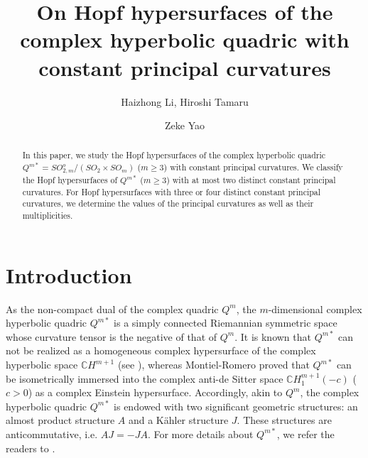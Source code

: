 \documentclass[reqno]{amsart}%
\title[On Hopf hypersurfaces of the complex hyperbolic quadric]
{On Hopf hypersurfaces of the complex hyperbolic quadric with constant principal curvatures}
\author{Haizhong Li, Hiroshi Tamaru \and Zeke Yao}
\date{}
\theoremstyle{definition}
\numberwithin{equation}{section}
\begin{document}
\begin{abstract}
In this paper, we study the Hopf hypersurfaces of the complex hyperbolic quadric
$Q^{m*}=SO^o_{2,m}/(SO_2\times SO_m)$ ($m\geq3$) with constant principal curvatures.
We classify the Hopf hypersurfaces of $Q^{m*}$ ($m\geq3$) with at most two
distinct constant principal curvatures. For Hopf hypersurfaces with three or four distinct constant principal curvatures, we determine the values of the principal curvatures as well as their multiplicities.
\end{abstract}

\maketitle

\section{Introduction}\label{sect:1}

As the non-compact dual of the complex quadric $Q^m$, the $m$-dimensional complex hyperbolic quadric
$Q^{m\ast}$ is a simply connected Riemannian symmetric space whose curvature tensor is
the negative of that of $Q^m$. It is known that $Q^{m\ast}$ can not be realized as a
homogeneous complex hypersurface of the complex hyperbolic space $\mathbb{C}H^{m+1}$
(see \cite{Sm-2}), whereas Montiel-Romero \cite{M-R} proved that $Q^{m*}$ can be isometrically
immersed into the complex anti-de Sitter space $\mathbb{C}H_1^{m+1}(-c)$
($c>0$) as a complex Einstein hypersurface. Accordingly, akin to $Q^m$,
the complex hyperbolic quadric $Q^{m\ast}$ is endowed with two significant geometric structures: an almost product structure $A$ and a K\"ahler structure $J$. These structures are anticommutative, i.e. $AJ = -JA$. 
For more details about $Q^{m\ast}$, we refer the readers to \cite{BS-2022,K-S,M-R,Suh4,V-W}.

%
\end{document}
